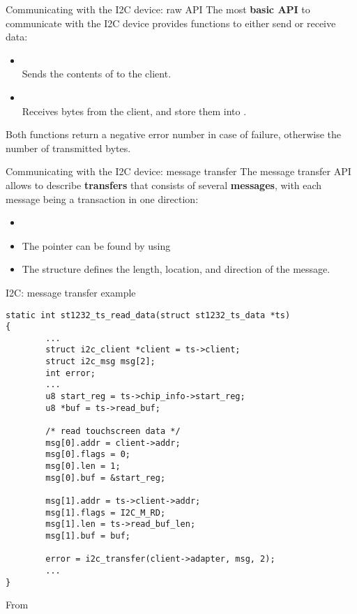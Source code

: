 \begin{frame}{Communicating with the I2C device: raw API}
  The most {\bf basic API} to communicate with the I2C device provides
  functions to either send or receive data:
  \begin{itemize}
  \item
    \\Sends the contents of  to the client.
  \item
    \\Receives {} bytes from the client, and store them into
    .
  \end{itemize}
  Both functions return a negative error number in case of failure, otherwise the
  number of transmitted bytes.
\end{frame}

\begin{frame}{Communicating with the I2C device: message transfer}
  The message transfer API allows to describe {\bf transfers} that
  consists of several {\bf messages}, with each message being a
  transaction in one direction:
  \begin{itemize}
  \item
  \item The  pointer can be found by using
  \item The  structure defines the length, location, and
    direction of the message.
  \end{itemize}
\end{frame}

\begin{frame}[fragile]{I2C: message transfer example}
\begin{block}{}
  \begin{verbatim}
static int st1232_ts_read_data(struct st1232_ts_data *ts)
{
        ...
        struct i2c_client *client = ts->client;
        struct i2c_msg msg[2];
        int error;
        ...
        u8 start_reg = ts->chip_info->start_reg;
        u8 *buf = ts->read_buf;

        /* read touchscreen data */
        msg[0].addr = client->addr;
        msg[0].flags = 0;
        msg[0].len = 1;
        msg[0].buf = &start_reg;

        msg[1].addr = ts->client->addr;
        msg[1].flags = I2C_M_RD;
        msg[1].len = ts->read_buf_len;
        msg[1].buf = buf;

        error = i2c_transfer(client->adapter, msg, 2);
        ...
}
\end{verbatim}
\end{block}
From 
\end{frame}

